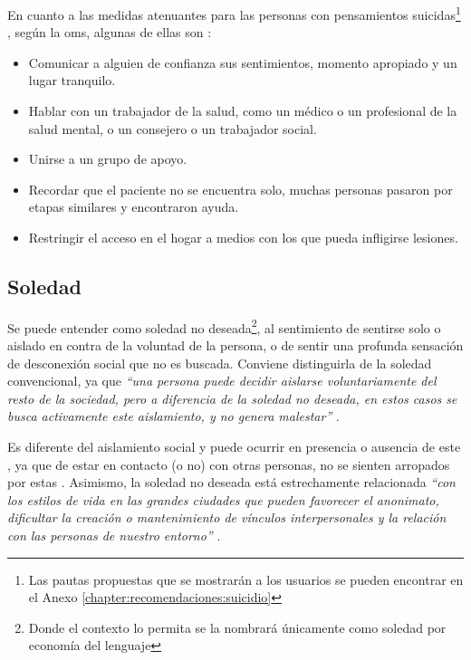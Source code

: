         En cuanto a las medidas atenuantes para las personas con pensamientos suicidas\footnote{Las pautas propuestas que se mostrarán a los usuarios se pueden encontrar en el Anexo \ref{chapter:recomendaciones:suicidio}} , según la \gls{oms}, algunas de ellas son \cite{oms_depresion_2023} \cite{oms_suicidio_2023}: 
        \begin{itemize}
            \item Comunicar a alguien de confianza sus sentimientos, momento apropiado y un lugar tranquilo.
            \item Hablar con un trabajador de la salud, como un médico o un profesional de la salud mental, o un consejero o un trabajador social.
            \item Unirse a un grupo de apoyo. 
            \item Recordar que el paciente no se encuentra solo, muchas personas pasaron por etapas similares y encontraron ayuda.
            \item Restringir el acceso en el hogar a medios con los que pueda infligirse lesiones.
        \end{itemize}
        
        
    \subsection{Soledad}

        Se puede entender como soledad no deseada\footnote{Donde el contexto lo permita se la nombrará únicamente como soledad por economía del lenguaje}, al sentimiento de sentirse solo o aislado en contra de la voluntad de la persona, o de sentir una profunda sensación de desconexión social que no es buscada. Conviene distinguirla de la soledad convencional, ya que \textit{``una persona puede decidir aislarse voluntariamente del resto de la sociedad, pero a diferencia de la soledad no deseada, en estos casos se busca activamente este aislamiento, y no genera malestar''} \cite{psicologos_soledad_2019}.
        
        Es diferente del aislamiento social y puede ocurrir en presencia o ausencia de este \cite{cazzola_soledad_2024}, ya que de estar en contacto (o no) con otras personas, no se sienten arropados por estas \cite{psicologos_soledad_2019}. Asimismo, la soledad no deseada está estrechamente relacionada \textit{``con los estilos de vida en las grandes ciudades que pueden favorecer el anonimato, dificultar la creación o mantenimiento de vínculos interpersonales y la relación con las personas de nuestro entorno''} \cite{ayuntamiento_de_madrid_que_nodate}.

